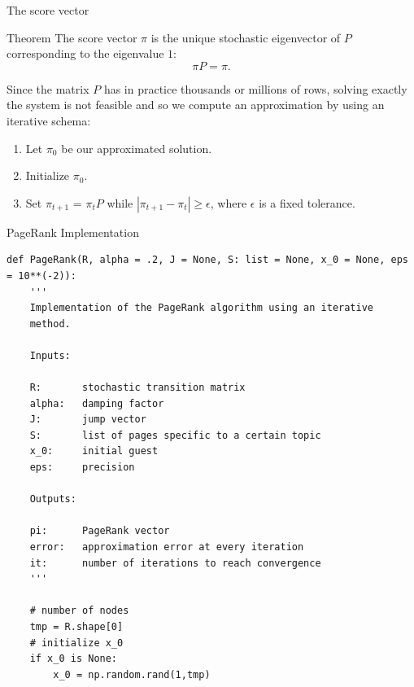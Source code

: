 \documentclass[10pt]{beamer}
\begin{document}
\begin{frame}{The score vector}
\begin{block}{Theorem}
The score vector $\pi$ is the unique stochastic eigenvector of $P$ corresponding to the eigenvalue $1$:
$$
\pi P = \pi.
$$
\end{block}

Since the matrix $P$ has in practice thousands or millions of rows, solving exactly the system is not feasible and so we compute an approximation by using an iterative schema:

\begin{enumerate}
\item Let $\pi_0$ be our approximated solution.
\item Initialize $\pi_0$.
\item Set $\pi_{t+1}$ = $\pi_{t} P$ while $|\pi_{t+1} - \pi_t| \geq \epsilon$, where $\epsilon$ is a fixed tolerance.
\end{enumerate}

\end{frame}

\begin{frame}[fragile]{PageRank Implementation}

\begin{lstlisting}[basicstyle=\tiny]
def PageRank(R, alpha = .2, J = None, S: list = None, x_0 = None, eps = 10**(-2)):
    '''
    Implementation of the PageRank algorithm using an iterative
    method.
    
    Inputs:
    
    R:       stochastic transition matrix
    alpha:   damping factor
    J:       jump vector
    S:       list of pages specific to a certain topic
    x_0:     initial guest
    eps:     precision
    
    Outputs:
    
    pi:      PageRank vector
    error:   approximation error at every iteration
    it:      number of iterations to reach convergence
    '''
    
    # number of nodes
    tmp = R.shape[0]
    # initialize x_0
    if x_0 is None:
        x_0 = np.random.rand(1,tmp)
\end{lstlisting}

\end{frame}
\end{document}
